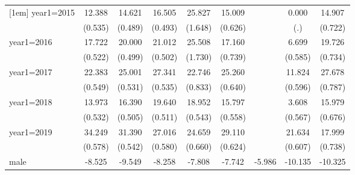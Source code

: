 \begin{table}[htbp]
\begin{tabular}{l*{8}{c}}
[1em]
year1=2015          &      12.388\sym{***}&      14.621\sym{***}&      16.505\sym{***}&      25.827\sym{***}&      15.009\sym{***}&                     &       0.000         &      14.907\sym{***}\\
                    &     (0.535)         &     (0.489)         &     (0.493)         &     (1.648)         &     (0.626)         &                     &         (.)         &     (0.722)         \\
[1em]
year1=2016          &      17.722\sym{***}&      20.000\sym{***}&      21.012\sym{***}&      25.508\sym{***}&      17.160\sym{***}&                     &       6.699\sym{***}&      19.726\sym{***}\\
                    &     (0.522)         &     (0.499)         &     (0.502)         &     (1.730)         &     (0.739)         &                     &     (0.585)         &     (0.734)         \\
[1em]
year1=2017          &      22.383\sym{***}&      25.001\sym{***}&      27.341\sym{***}&      22.746\sym{***}&      25.260\sym{***}&                     &      11.824\sym{***}&      27.678\sym{***}\\
                    &     (0.549)         &     (0.531)         &     (0.535)         &     (0.833)         &     (0.640)         &                     &     (0.596)         &     (0.787)         \\
[1em]
year1=2018          &      13.973\sym{***}&      16.390\sym{***}&      19.640\sym{***}&      18.952\sym{***}&      15.797\sym{***}&                     &       3.608\sym{***}&      15.979\sym{***}\\
                    &     (0.532)         &     (0.505)         &     (0.511)         &     (0.543)         &     (0.558)         &                     &     (0.567)         &     (0.676)         \\
[1em]
year1=2019          &      34.249\sym{***}&      31.390\sym{***}&      27.016\sym{***}&      24.659\sym{***}&      29.110\sym{***}&                     &      21.634\sym{***}&      17.999\sym{***}\\
                    &     (0.578)         &     (0.542)         &     (0.580)         &     (0.660)         &     (0.624)         &                     &     (0.607)         &     (0.738)         \\
[1em]
male                &      -8.525\sym{***}&      -9.549\sym{***}&      -8.258\sym{***}&      -7.808\sym{***}&      -7.742\sym{***}&      -5.986\sym{***}&     -10.135\sym{***}&     -10.325\sym{***}\\

\end{tabular}
\end{table}
